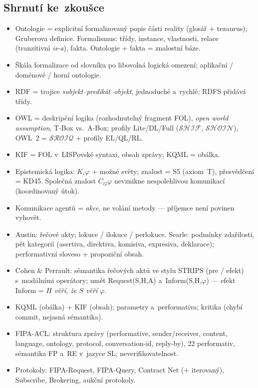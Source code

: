 \documentclass[11pt,a4paper]{article}
\theoremstyle{definition}
\begin{document}
\subsection{Shrnutí ke~zkoušce}

\begin{itemize}
\item Ontologie = explicitní formalizovaný popis části reality (glosář + tezaurus);
  Gruberova definice. Formalismus: třídy, instance, vlastnosti, relace (tranzitivní
  \emph{is-a}), fakta. Ontologie + fakta = znalostní báze.
\item Škála formalizace od slovníku po libovolná logická omezení; aplikační / doménové /
  horní ontologie.
\item RDF = trojice \emph{subjekt--predikát--objekt}, jednoduché a~rychlé; RDFS přidává třídy.
\item OWL = deskripční logika (rozhodnutelný fragment FOL), \emph{open world assumption},
  T-Box vs.\ A-Box; profily Lite/DL/Full ($\mathcal{SHIF}$, $\mathcal{SHOIN}$),
  OWL~2 = $\mathcal{SROIQ}$ + profily EL/QL/RL.
\item KIF = FOL v~LISPovské syntaxi, obsah zprávy; KQML = obálka.
\item Epistemická logika: $K_i\varphi$ + možné světy; znalost = S5 (axiom~T), přesvědčení
  = KD45. Společná znalost $C_G\varphi$ nevznikne nespolehlivou komunikací (koordinovaný útok).
\item Komunikace agentů = \emph{akce}, ne volání metody --- příjemce není povinen vyhovět.
\item Austin: řečové akty; lokuce / ilokuce / perlokuce. Searle: podmínky zdařilosti,
  pět kategorií (asertiva, direktiva, komisiva, expresiva, deklarace); performativní sloveso
  + propoziční obsah.
\item Cohen \& Perrault: sémantika řečových aktů ve stylu STRIPS (pre / efekt) s~modálními
  operátory; umět Request(S,H,A) a~Inform(S,H,$\varphi$) --- efekt Inform =
  \emph{$H$ věří, že $S$ věří $\varphi$}.
\item KQML (obálka) + KIF (obsah); parametry a~performativa; kritika (chybí commit, nejasná
  sémantika).
\item FIPA-ACL: struktura zprávy (performative, sender/receiver, content, language, ontology,
  protocol, conversation-id, reply-by), 22 performativ, sémantika FP a~RE v~jazyce SL;
  neverifikovatelnost.
\item Protokoly: FIPA-Request, FIPA-Query, Contract Net (+ iterovaný), Subscribe, Brokering,
  aukční protokoly.
\end{itemize}
\end{document}
